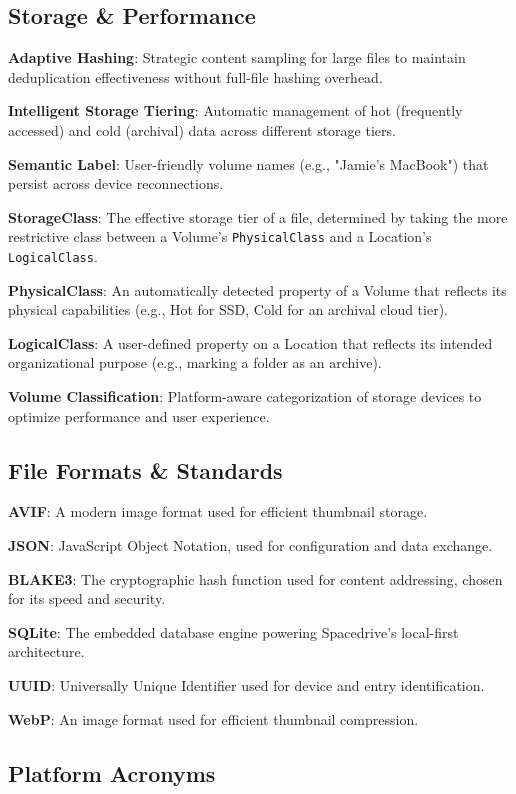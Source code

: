 \documentclass[sigconf]{acmart}
\begin{document}
\subsection*{Storage \& Performance}

\textbf{Adaptive Hashing}: Strategic content sampling for large files to maintain deduplication effectiveness without full-file hashing overhead.

\textbf{Intelligent Storage Tiering}: Automatic management of hot (frequently accessed) and cold (archival) data across different storage tiers.

\textbf{Semantic Label}: User-friendly volume names (e.g., "Jamie's MacBook") that persist across device reconnections.

\textbf{StorageClass}: The effective storage tier of a file, determined by taking the more restrictive class between a Volume's \texttt{PhysicalClass} and a Location's \texttt{LogicalClass}.

\textbf{PhysicalClass}: An automatically detected property of a Volume that reflects its physical capabilities (e.g., Hot for SSD, Cold for an archival cloud tier).

\textbf{LogicalClass}: A user-defined property on a Location that reflects its intended organizational purpose (e.g., marking a folder as an archive).

\textbf{Volume Classification}: Platform-aware categorization of storage devices to optimize performance and user experience.

\subsection*{File Formats \& Standards}

\textbf{AVIF}: A modern image format used for efficient thumbnail storage.

\textbf{JSON}: JavaScript Object Notation, used for configuration and data exchange.

\textbf{BLAKE3}: The cryptographic hash function used for content addressing, chosen for its speed and security.

\textbf{SQLite}: The embedded database engine powering Spacedrive's local-first architecture.

\textbf{UUID}: Universally Unique Identifier used for device and entry identification.

\textbf{WebP}: An image format used for efficient thumbnail compression.

\subsection*{Platform Acronyms}
\end{document}
